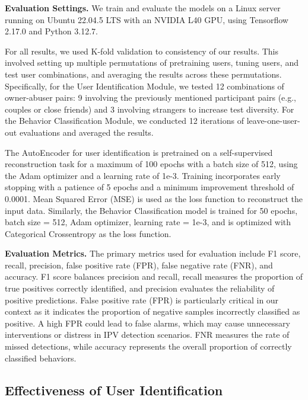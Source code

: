\noindent\textbf{Evaluation Settings.} We train and evaluate the models on a Linux server running on Ubuntu 22.04.5 LTS with an NVIDIA L40 GPU, using Tensorflow 2.17.0 and Python 3.12.7. 

For all results, we used K-fold validation to consistency of our results. This involved setting up multiple permutations of pretraining users, tuning users, and test user combinations, and averaging the results across these permutations. Specifically, for the User Identification Module, we tested 12 combinations of owner-abuser pairs: 9 involving the previously mentioned participant pairs (e.g., couples or close friends) and 3 involving strangers to increase test diversity. For the Behavior Classification Module, we conducted 12 iterations of leave-one-user-out evaluations and averaged the results.

The AutoEncoder for user identification is pretrained on a self-supervised reconstruction task for a maximum of 100 epochs with a batch size of 512, using the Adam optimizer and a learning rate of 1e-3. Training incorporates early stopping with a patience of 5 epochs and a minimum improvement threshold of 0.0001. Mean Squared Error (MSE) is used as the loss function to reconstruct the input data. Similarly, the Behavior Classification model is trained for 50 epochs, batch size = 512, Adam optimizer, learning rate = 1e-3, and is optimized with Categorical Crossentropy as the loss function.

\noindent\textbf{Evaluation Metrics.} The primary metrics used for evaluation include F1 score, recall, precision, false positive rate (FPR), false negative rate (FNR), and accuracy. F1 score balances precision and recall, recall measures the proportion of true positives correctly identified, and precision evaluates the reliability of positive predictions. False positive rate (FPR) is particularly critical in our context as it indicates the proportion of negative samples incorrectly classified as positive. A high FPR could lead to false alarms, which may cause unnecessary interventions or distress in IPV detection scenarios. FNR measures the rate of missed detections, while accuracy represents the overall proportion of correctly classified behaviors. %


\subsection{Effectiveness of User Identification}\label{Level 1 eval}

